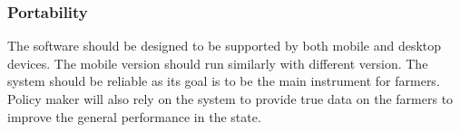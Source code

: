 \subsubsection{Portability}
The software should be designed to be supported by both mobile and desktop devices. The mobile version should run similarly with different version.
The system should be reliable as its goal is to be the main instrument for farmers. Policy maker will also rely on the system to provide true data on the farmers to improve the general performance in the state.


